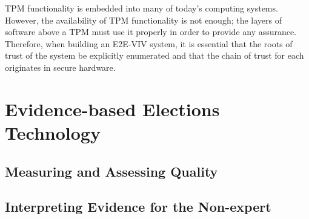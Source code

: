 TPM functionality is embedded into many of today's computing
systems. However, the availability of TPM functionality is not enough;
the layers of software above a TPM must use it properly in order to
provide any assurance. Therefore, when building an E2E-VIV system, it
is essential that the roots of trust of the system be explicitly
enumerated and that the chain of trust for each originates in secure
hardware.

\section{Evidence-based Elections Technology}


\subsection{Measuring and Assessing Quality}

\subsection{Interpreting Evidence for the Non-expert}

